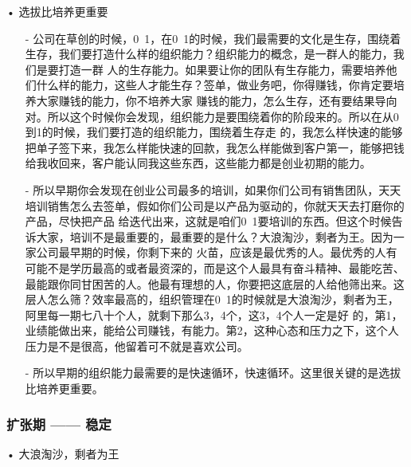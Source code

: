 \documentclass[12pt]{article}
\begin{document}
• 选拔比培养更重要
\begin{itemize}
\setlength{\itemsep}{0pt}
\setlength{\parsep}{0pt}
\setlength{\parskip}{0pt}
    \item[-] 公司在草创的时候，0~1，在0~1的时候，我们最需要的文化是生存，围绕着生存，我们要打造什么样的组织能力？组织能力的概念，是一群人的能力，我们是要打造一群 人的生存能力。如果要让你的团队有生存能力，需要培养他们什么样的能力，这些人才能生存？签单，做业务吧，你得赚钱，你肯定要培养大家赚钱的能力，你不培养大家 赚钱的能力，怎么生存，还有要结果导向对。所以这个时候你会发现，组织能力是要围绕着你的阶段来的。所以在从0到1的时候，我们要打造的组织能力，围绕着生存走 的，我怎么样快速的能够把单子签下来，我怎么样能快速的回款，我怎么样能做到客户第一，能够把钱给我收回来，客户能认同我这些东西，这些能力都是创业初期的能力。
    \item[-] 所以早期你会发现在创业公司最多的培训，如果你们公司有销售团队，天天培训销售怎么去签单，假如你们公司是以产品为驱动的，你就天天去打磨你的产品，尽快把产品 给迭代出来，这就是咱们0~1要培训的东西。但这个时候告诉大家，培训不是最重要的，最重要的是什么？大浪淘沙，剩者为王。因为一家公司最早期的时候，你剩下来的 火苗，应该是最优秀的人。最优秀的人有可能不是学历最高的或者最资深的，而是这个人最具有奋斗精神、最能吃苦、最能跟你同甘困苦的人。他最有理想的人，你要把这底层的人给他筛出来。这层人怎么筛？效率最高的，组织管理在0~1的时候就是大浪淘沙，剩者为王，阿里每一期七八十个人，就剩下那么3，4个，这3，4个人一定是好 的，第1，业绩能做出来，能给公司赚钱，有能力。第2，这种心态和压力之下，这个人压力是不是很高，他留着可不就是喜欢公司。
    \item[-] 所以早期的组织能力最需要的是快速循环，快速循环。这里很关键的是选拔比培养更重要。
\end{itemize}

\subsubsection{扩张期 —— 稳定}
• 大浪淘沙，剩者为王
\end{document}
